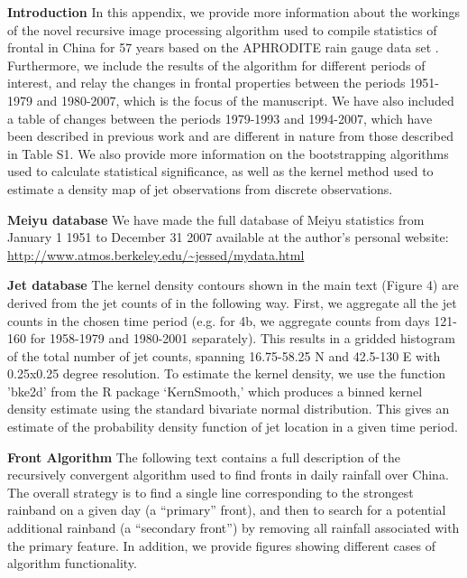 \documentclass[draft,grl]{agutexSI}
\begin{document}
\begin{article}
\noindent\textbf{Introduction}
In this appendix, we provide more information about the workings of the novel recursive image processing algorithm used to compile statistics of frontal in China for 57 years based on the APHRODITE rain gauge data set \citep{Yatagai2012}. Furthermore, we include the results of the algorithm for different periods of interest, and relay the changes in frontal properties between the periods 1951-1979 and 1980-2007, which is the focus of the manuscript. We have also included a table of changes between the periods 1979-1993 and 1994-2007, which have been described in previous work and are different in nature from those described in Table S1. We also provide more information on the bootstrapping algorithms used to calculate statistical significance, as well as the kernel method used to estimate a density map of jet observations from discrete observations.

\clearpage

\noindent\textbf{Meiyu database}
We have made the full database of Meiyu statistics from January 1 1951 to December 31 2007 available at the author's personal website: \url{http://www.atmos.berkeley.edu/~jessed/mydata.html}


\noindent\textbf{Jet database}
The kernel density contours shown in the main text (Figure 4) are derived from the jet counts of \citet{Schiemann2009} in the following way. First, we aggregate all the jet counts in the chosen time period (e.g. for 4b, we aggregate counts from days 121-160 for 1958-1979 and 1980-2001 separately). This results in a gridded histogram of the total number of jet counts, spanning 16.75-58.25 N and 42.5-130 E with 0.25x0.25 degree resolution. To estimate the kernel density, we use the function 'bke2d' from the R package `KernSmooth,' which produces a binned kernel density estimate using the standard bivariate normal distribution. This gives an estimate of the probability density function of jet location in a given time period. 

\clearpage

\noindent\textbf{Front Algorithm}
The following text contains a full description of the recursively convergent algorithm used to find fronts in daily rainfall over China. The overall strategy is to find a single line corresponding to the strongest rainband on a given day (a ``primary'' front), and then to search for a potential additional rainband (a ``secondary front'') by removing all rainfall associated with the primary feature. In addition, we provide figures showing different cases of algorithm functionality.


\end{article}
\end{document}
